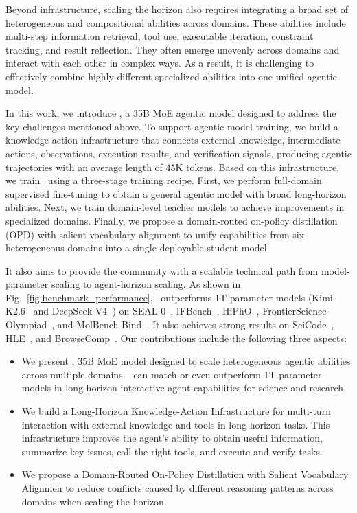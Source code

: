Beyond infrastructure, scaling the horizon also requires integrating a broad set of heterogeneous and compositional abilities across domains. These abilities include multi-step information retrieval, tool use, executable iteration, constraint tracking, and result reflection. They often emerge unevenly across domains and interact with each other in complex ways. As a result, it is challenging to effectively combine highly different specialized abilities into one unified agentic model.

In this work, we introduce \ProjectName, a 35B MoE agentic model designed to address the key challenges mentioned above. To support agentic model training, we build a knowledge-action infrastructure that connects external knowledge, intermediate actions, observations, execution results, and verification signals, producing agentic trajectories with an average length of 45K tokens. Based on this infrastructure, we train \ProjectName~using a three-stage training recipe. First, we perform full-domain supervised fine-tuning to obtain a general agentic model with broad long-horizon abilities. Next, we train domain-level teacher models to achieve improvements in specialized domains. Finally, we propose a domain-routed on-policy distillation (OPD) with salient vocabulary alignment to unify capabilities from six heterogeneous domains into a single deployable student model.

It also aims to provide the community with a scalable technical path from model-parameter scaling to agent-horizon scaling. As shown in Fig.~\ref{fig:benchmark_performance}, \ProjectName~outperforms 1T-parameter models (Kimi-K2.6~\citep{kimi2.6} and DeepSeek-V4~\citep{deepseekai2026deepseekv4}) on SEAL-0~\citep{sealqa}, IFBench~\citep{IFBench}, HiPhO~\citep{hipho}, FrontierScience-Olympiad~\citep{frontierscience}, and MolBench-Bind~\citep{zhang2026molclaw}. It also achieves strong results on SciCode~\citep{scicode}, HLE~\citep{phan2025humanity}, and BrowseComp~\citep{browsecomp}. Our contributions include the following three aspects:
\begin{itemize}
    \item We present \ProjectName, 35B MoE model designed to scale heterogeneous agentic abilities across multiple domains. \ProjectName~can match or even outperform 1T-parameter models in long-horizon interactive agent capabilities for science and research.
    \item We build a Long-Horizon Knowledge-Action Infrastructure for multi-turn interaction with external knowledge and tools in long-horizon tasks. This infrastructure improves the agent’s ability to obtain useful information, summarize key issues, call the right tools, and execute and verify tasks.
    \item We propose a Domain-Routed On-Policy Distillation with Salient Vocabulary Alignmen to reduce conflicts caused by different reasoning patterns across domains when scaling the horizon.
\end{itemize}
